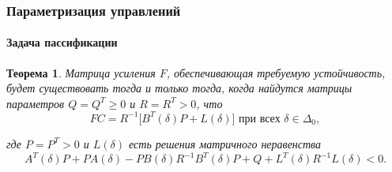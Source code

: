 \documentclass[ignorenonframetext,hyperref={pdftex,unicode},compress,handout]{beamer}
\newtheorem{teo}{Теорема}
\begin{document}
\begin{frame}
    \frametitle{Параметризация управлений}
    \framesubtitle{Задача пассификации}
    \small
    \begin{teo}
        \par Матрица усиления $F$, обеспечивающая требуемую устойчивость, будет существовать тогда и только тогда, когда найдутся матрицы параметров $Q = Q^T \geqslant 0$ и $R = R^T > 0$, что
        \begin{equation}
            FC = R^{-1}\big[ B^T(\delta)P + L(\delta) \big] \mbox{ при всех } \delta \in \Delta_0{,}
        \end{equation}
        \par где $P = P^T > 0$ и $L(\delta)$ есть решения матричного неравенства
        \begin{equation}
            A^T(\delta)P + PA(\delta) - PB(\delta)R^{-1}B^T(\delta)P + Q + L^T(\delta)R^{-1}L(\delta) < 0\mbox{.}
        \end{equation}
    \end{teo}
\end{frame}
\end{document}
